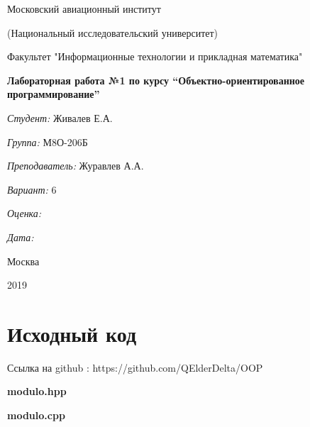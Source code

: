 \documentclass[a4paper, 12pt]{article}
\begin{document}
\thispagestyle{empty}	
\begin{center}
	Московский авиационный институт
	
	(Национальный исследовательский университет)
	
	Факультет "Информационные технологии и прикладная математика"
	
\end{center}
\vspace{40ex}
\begin{center}
	\textbf{\large{Лабораторная работа №1 по курсу \textquotedblleft Объектно-ориентированное программирование\textquotedblright}}
\end{center}
\vspace{40ex}
\begin{flushright}
	\textit{Студент: } Живалев Е.А.
	
	\vspace{2ex}
	\textit{Группа: } М8О-206Б
	
	\vspace{2ex}
	\textit{Преподаватель: } Журавлев А.А.
	
	\vspace{2ex}
	\textit{Вариант: } 6
	
	\vspace{2ex}
	\textit{Оценка: } \underline{\quad\quad\quad\quad\quad\quad}
	
	 \vspace{2ex}
	\textit{Дата: } \underline{\quad\quad\quad\quad\quad\quad}
	
\end{flushright}

\begin{vfill}
	\begin{center}
		Москва
		
		2019
	\end{center}	
\end{vfill}
\newpage
\section{Исходный код}

Ссылка на github : https://github.com/QElderDelta/OOP

\vspace{3ex}
\textbf{\large{modulo.hpp}}


\vspace{3ex}
\textbf{\large{modulo.cpp}}

\end{document}
